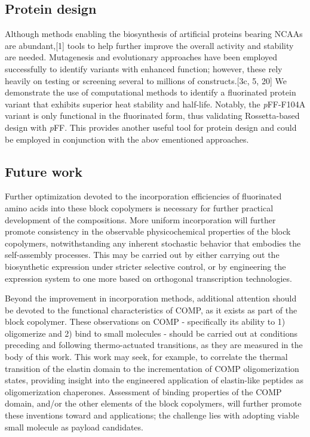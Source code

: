 \begin{refsection}
\subsection{Protein design}

Although methods enabling the biosynthesis of artificial proteins bearing NCAAs
are abundant,[1] tools to help further improve the overall activity and
stability are needed. Mutagenesis and evolutionary approaches have been
employed successfully to identify variants with enhanced function; however,
these rely heavily on testing or screening several to millions of
constructs.[3c, 5, 20] We demonstrate the use of computational methods to
identify a fluorinated protein variant that exhibits superior heat stability
and half-life. Notably, the \emph{p}FF-F104A variant is only functional in the
fluorinated form, thus validating Rossetta-based design with \emph{p}FF. This
provides another useful tool for protein design and could be employed in
conjunction with the abov ementioned approaches.

\subsection{Future work}

Further optimization devoted to the incorporation efficiencies of fluorinated
amino acids into these block copolymers is necessary for further practical
development of the compositions. More uniform incorporation will further
promote consistency in the observable physicochemical properties of the block
copolymers, notwithstanding any inherent stochastic behavior that embodies the
self-assembly processes. This may be carried out by either carrying out the
biosynthetic expression under stricter selective control, or by engineering the
expression system to one more based on orthogonal transcription technologies.

Beyond the improvement in incorporation methods, additional attention should be
devoted to the functional characteristics of COMP, as it exists as part of the
block copolymer. These observations on COMP - specifically its ability to 1)
oligomerize and 2) bind to small molecules - should be carried out at
conditions preceding and following thermo-actuated transitions, as they are
measured in the body of this work. This work may seek, for example, to
correlate the thermal transition of the elastin domain to the incrementation of
COMP oligomerization states, providing insight into the engineered application
of elastin-like peptides as oligomerization chaperones. Assessment of binding
properties of the COMP domain, and/or the other elements of the block
copolymers, will further promote these inventions toward  and
 applications; the challenge lies with adopting viable small
molecule as payload candidates.

\printbibliography[heading=subbibliography]

\end{refsection}
